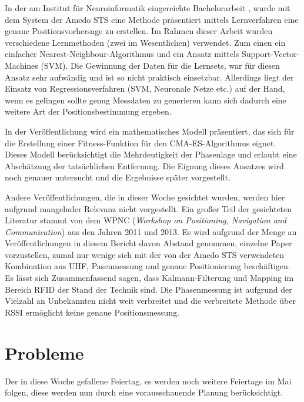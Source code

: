 \documentclass[a4paper,12pt,fleqn]{article}
\begin{document}
In der am Institut für Neuroinformatik eingereichte Bachelorarbeit \cite{Muz1}, wurde mit dem System der Amedo STS eine Methode präsentiert mittels Lernverfahren eine genaue Positionsvorhersage zu erstellen. Im Rahmen dieser Arbeit wurden verschiedene Lernmethoden (zwei im Wesentlichen) verwendet. Zum einen ein einfacher Nearest-Neighbour-Algorithmus und ein Ansatz mittels Support-Vector-Machines (SVM). Die Gewinnung der Daten für die Lernsets, war für diesen Ansatz sehr aufwändig und ist so nicht praktisch einsetzbar. Allerdings liegt der Einsatz von Regressionsverfahren (SVM, Neuronale Netze etc.) auf der Hand, wenn es gelingen sollte genug Messdaten zu generieren kann sich dadurch eine weitere Art der Positionsbestimmung ergeben. 

In der Veröffentlichung \cite{Wil1} wird ein mathematisches Modell präsentiert, das sich für die Erstellung einer Fitness-Funktion für den CMA-ES-Algorithmus eignet. Dieses Modell berücksichtigt die Mehrdeutigkeit der Phasenlage und erlaubt eine Abschätzung der tatsächlichen Entfernung. Die Eignung dieses Ansatzes wird noch genauer untersucht und die Ergebnisse später vorgestellt.

Andere Veröffentlichungen, die in dieser Woche gesichtet wurden, werden hier aufgrund mangelnder Relevanz nicht vorgestellt. Ein großer Teil der gesichteten Literatur stammt von dem WPNC (\textit{Workshop on Positioning, Navigation and Communication}) aus den Jahren 2011 und 2013. Es wird aufgrund der Menge an Veröffentlichungen in diesem Bericht davon Abstand genommen, einzelne Paper vorzustellen, zumal nur wenige sich mit der von der Amedo STS verwendeten Kombination aus UHF, Pasenmessung und genaue Positionierung beschäftigen. Es lässt sich Zusammenfassend sagen, dass Kalmann-Filterung und Mapping im Bereich RFID der Stand der Technik sind. Die Phasenmessung ist aufgrund der Vielzahl an Unbekannten nicht weit verbreitet und die verbreitete Methode über RSSI ermöglicht keine genaue Positionsmessung.

\section[Probleme]{Probleme}
Der in diese Woche gefallene Feiertag, es werden noch weitere Feiertage im Mai folgen, diese werden nun durch eine vorausschauende Planung berücksichtigt.



\newpage


\end{document}
